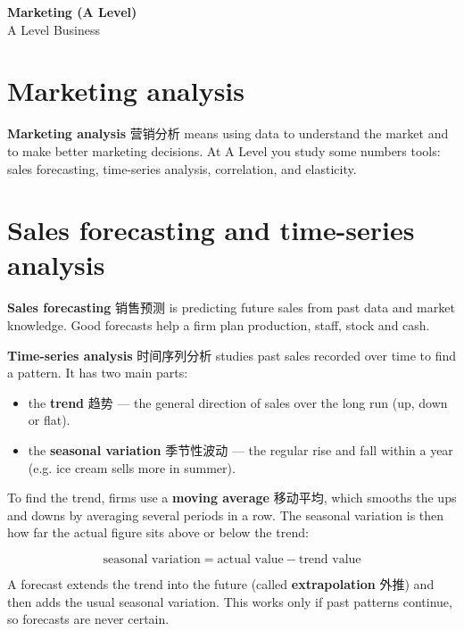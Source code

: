 \documentclass[11pt]{article}
\begin{document}
\begin{center}
  {\LARGE\bfseries Marketing (A Level)}\\[0.35em]
  {\large A Level Business}
\end{center}
\vspace{0.6em}

\section*{Marketing analysis}

\textbf{Marketing analysis} 营销分析 means using data to understand the market and to make better marketing decisions. At A Level you study some numbers tools: sales forecasting, time-series analysis, correlation, and elasticity.

\section*{Sales forecasting and time-series analysis}

\textbf{Sales forecasting} 销售预测 is predicting future sales from past data and market knowledge. Good forecasts help a firm plan production, staff, stock and cash.

\textbf{Time-series analysis} 时间序列分析 studies past sales recorded over time to find a pattern. It has two main parts:

\begin{itemize}
\item the \textbf{trend} 趋势 — the general direction of sales over the long run (up, down or flat).

\item the \textbf{seasonal variation} 季节性波动 — the regular rise and fall within a year (e.g. ice cream sells more in summer).

\end{itemize}

To find the trend, firms use a \textbf{moving average} 移动平均, which smooths the ups and downs by averaging several periods in a row. The seasonal variation is then how far the actual figure sits above or below the trend:

\[
\text{seasonal variation} = \text{actual value} - \text{trend value}
\]

A forecast extends the trend into the future (called \textbf{extrapolation} 外推) and then adds the usual seasonal variation. This works only if past patterns continue, so forecasts are never certain.
\end{document}
